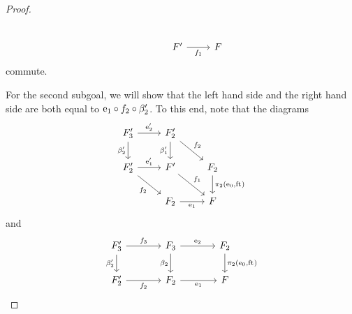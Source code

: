 \begin{proof}
\begin{equation*}
\begin{tikzcd}
  \\
{}&
\stesysf'
  \arrow[r,swap,"f_1"]
  &
\stesysf
\end{tikzcd}
\end{equation*}
commute.
\begin{comment}
\begin{equation*}
\begin{tikzcd}[column sep=large]
{} &
\stesysf_2'
  \ar{r}{f_2}
  \ar{dr}[near end]{\pullbackpr{1}{\ectxext'}{\eft'}}
  &
\stesysf_2
  \ar{dr}{\pullbackpr{1}{\ectxext}{\eft}}
  \\
\stesysf_3'
  \ar{ur}{\eext{2}'}
  \ar{r}[swap]{\beta_2'}
  \ar{ddr}[swap]{f_3}
  &
\stesysf_2'
  \ar{r}{\efamext'}
  \ar{dr}[swap]{f_2}
  &
\stesysf'
  \ar{r}{f_1}
  &
\stesysf
  \\
{} & {} &
\stesysf_2
  \ar{ur}[near start]{\efamext}
  \\
{} &
\stesysf_3
  \ar{r}[swap]{\eext{2}}
  \ar{ur}{\beta_2}
  &
\stesysf_2
  \ar{uur}[swap]{\pullbackpr{1}{\ectxext}{\eft}}
\end{tikzcd}
\end{equation*}
commutes.
\end{comment}
For the second subgoal, we will show that the left hand side and the right hand
side are both equal to $\mathrm{e}_{1}\circ f_2\circ\beta_2'$. To this end, note that
the diagrams
\begin{equation*}
\begin{tikzcd}
\stesysf_3'
  \arrow[r,"{\eext{2}'}"]
  \arrow[d,swap,"{\beta_2'}"]
  &
\stesysf_2'
  \arrow[dr,"f_2"]
  \arrow[d,swap,"{\beta_1'}"]
  \\
\stesysf_2'
  \arrow[r,"{\eext{1}'}"]
  \arrow[dr,swap,"{f_2}"]
  &
\stesysf'
  \arrow[dr,"{f_1}"]
  &
\stesysf_2
  \arrow[d,"\pullbackpr{2}{\ectxext}{\eft}"]
  \\
{}&
\stesysf_2
  \arrow[r,swap,"\efamext"]
  &
\stesysf
\end{tikzcd}
\end{equation*}
and
\begin{equation*}
\begin{tikzcd}[column sep=large]
\stesysf_3'
  \arrow[r,"f_3"]
  \arrow[d,swap,"{\beta_2'}"]
  &
\stesysf_3
  \arrow[r,"\eext{2}"]
  \arrow[d,swap,"{\beta_2}"]
  &
\stesysf_2
  \arrow[d,"\pullbackpr{2}{\ectxext}{\eft}"]
  \\
\stesysf_2'
  \arrow[r,swap,"f_2"]
  &
\stesysf_2
  \arrow[r,swap,"\efamext"]
  &
\stesysf
\end{tikzcd}
\end{equation*}

\end{proof}
